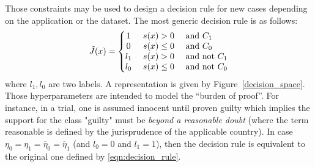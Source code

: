 \documentclass[sigconf,edbt]{acmart-edbt-workshops}
\begin{document}
Those constraints may be used to design a decision rule for new cases depending on the application or the dataset. The most generic decision rule is as follows:
\begin{align}
\label{eqn:decision_rule_revised}
   \tilde J(x) =  \left\{\begin{matrix}
  1 & ~ s( x) > 0 & \text{ and } C_1 \hfill\\ 
  0 & ~  s( x) \leq 0 &\text{ and } C_0 \hfill\\
  l_1 & ~ s( x) > 0 & \text{ and not } C_1 \hfill\\ 
  l_0 & ~  s( x) \leq 0 & \text{ and not } C_0 \hfill
  \end{matrix}\right.
  \end{align} where $l_1, l_0$ are two labels. A representation is given by Figure~\ref{decision_space}.
Those hyperparameters are intended to model the ``burden of proof''. For instance, in a trial, one is assumed innocent until proven guilty which implies the support for the class "guilty" must be {\it beyond a reasonable doubt} (where the term reasonable is defined by the jurisprudence of the applicable country). In case $\eta_0 = \eta_1 = \bar \eta_0 = \bar \eta_1$ (and $l_0 = 0$ and $l_1 = 1$), then the decision rule is equivalent to the original one defined by \eqref{eqn:decision_rule}.
\end{document}
